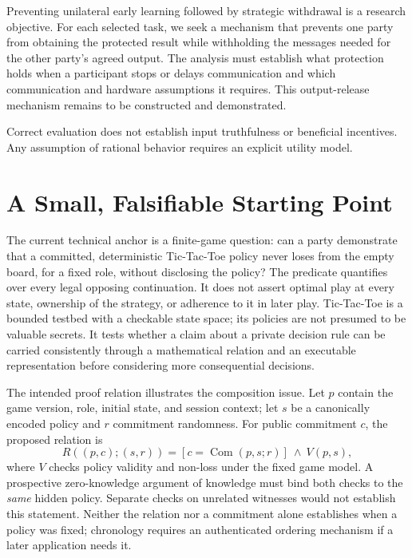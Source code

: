 \documentclass[conference,letterpaper]{IEEEtran}
\begin{document}
Preventing unilateral early learning followed by strategic withdrawal is a
research objective. For each selected task, we seek a mechanism that prevents
one party from obtaining the protected result while withholding the messages
needed for the other party's agreed output. The analysis must establish what
protection holds when a participant stops or delays communication and which
communication and hardware assumptions it requires. This output-release
mechanism remains to be constructed and demonstrated.

Correct evaluation does not establish input truthfulness or beneficial
incentives. Any assumption of rational behavior requires an explicit utility
model.

\section{A Small, Falsifiable Starting Point}
The current technical anchor is a finite-game question: can a party
demonstrate that a committed, deterministic Tic-Tac-Toe policy never loses
from the empty board, for a fixed role, without disclosing the policy?
The predicate quantifies over every legal opposing continuation. It does not
assert optimal play at every state, ownership of the strategy, or adherence
to it in later play. Tic-Tac-Toe is a bounded testbed with a checkable
state space; its policies are not presumed to be valuable secrets. It tests
whether a claim about a private decision rule can be carried consistently
through a mathematical relation and an executable representation before
considering more consequential decisions.

The intended proof relation illustrates the composition issue. Let $p$
contain the game version, role, initial state, and session context; let $s$
be a canonically encoded policy and $r$ commitment randomness. For public
commitment $c$, the proposed relation is
\begin{equation}
 R((p,c);(s,r)) =
 [c=\operatorname{Com}(p,s;r)]\ \land\ V(p,s),
\end{equation}
where $V$ checks policy validity and non-loss under the fixed game model.
A prospective zero-knowledge argument of knowledge must bind both checks
to the \emph{same} hidden policy. Separate checks on unrelated witnesses
would not establish this statement. Neither the relation nor a commitment
alone establishes when a policy was fixed; chronology requires an
authenticated ordering mechanism if a later application needs it.
\end{document}
